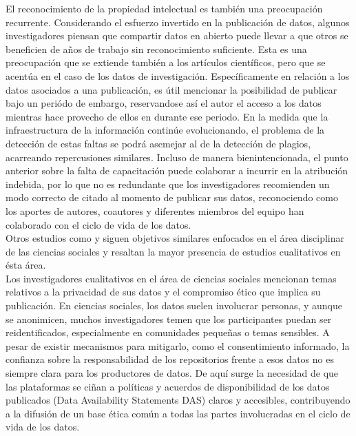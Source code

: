 \documentclass{article}
\begin{document}

El reconocimiento de la propiedad intelectual es también una preocupación recurrente. Considerando el esfuerzo invertido en la publicación de datos, algunos investigadores piensan que compartir datos en abierto puede llevar a que otros se beneficien de años de trabajo sin reconocimiento suficiente. Esta es una preocupación que se extiende también a los artículos científicos, pero que se acentúa en el caso de los datos de investigación.
Específicamente en relación a los datos asociados a una publicación, es útil mencionar la posibilidad de publicar bajo un periódo de embargo, reservandose así el autor el acceso a los datos mientras hace provecho de ellos en durante ese periodo. En la medida que la infraestructura de la información continúe evolucionando, el problema de la detección de estas faltas se podrá asemejar al de la detección de plagios, acarreando repercusiones similares. Incluso de manera bienintencionada, el punto anterior sobre la falta de capacitación puede colaborar a incurrir en la atribución indebida, por lo que no es redundante que los investigadores recomienden un modo correcto de citado al momento de publicar sus datos, reconociendo como los aportes de autores, coautores y diferentes miembros del equipo han colaborado con el ciclo de vida de los datos.\\

Otros estudios como \cite{devriendt2021} y \cite{prosser2022} siguen objetivos similares enfocados en el área disciplinar de las ciencias sociales y resaltan la mayor presencia de estudios cualitativos en ésta área.\\

Los investigadores cualitativos en el área de ciencias sociales mencionan temas relativos a la privacidad de sus datos y el compromiso ético que implica su publicación. En ciencias sociales, los datos suelen involucrar personas, y aunque se anonimicen, muchos investigadores temen que los participantes puedan ser reidentificados, especialmente en comunidades pequeñas o temas sensibles. A pesar de existir mecanismos para mitigarlo, como el consentimiento informado, la confianza sobre la responsabilidad de los repositorios frente a esos datos no es siempre clara para los productores de datos. De aquí surge la necesidad de que las plataformas se ciñan a políticas y acuerdos de disponibilidad de los datos publicados (Data Availability Statements \- DAS) claros y accesibles, contribuyendo a la difusión de un base ética común a todas las partes involucradas en el ciclo de vida de los datos.\\
\end{document}
